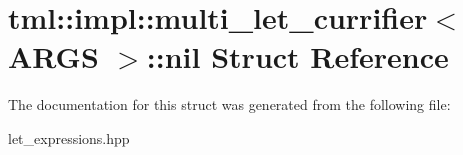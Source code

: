 \hypertarget{structtml_1_1impl_1_1multi__let__currifier_1_1nil}{\section{tml\+:\+:impl\+:\+:multi\+\_\+let\+\_\+currifier$<$ A\+R\+G\+S $>$\+:\+:nil Struct Reference}
\label{structtml_1_1impl_1_1multi__let__currifier_1_1nil}
}


The documentation for this struct was generated from the following file\+:\begin{DoxyCompactItemize}
\item 
let\+\_\+expressions.\+hpp\end{DoxyCompactItemize}
